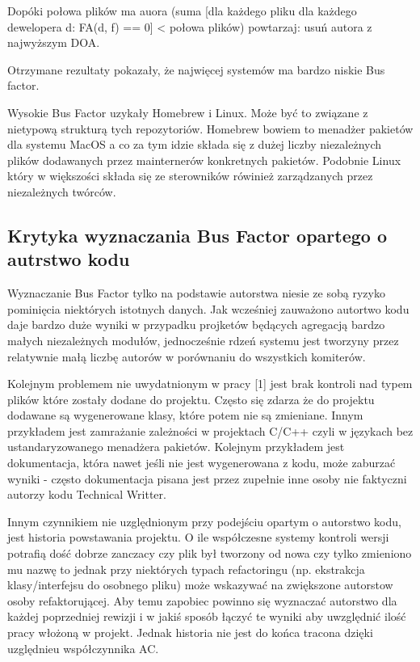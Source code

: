 \documentclass[a4paper,11pt,twoside]{report}
\theoremstyle{definition}
\begin{document}
Dopóki połowa plików ma auora (suma [dla każdego pliku dla każdego 
dewelopera d: FA(d, f) == 0] < połowa plików) powtarzaj: usuń autora z 
najwyższym DOA.

Otrzymane rezultaty pokazały, że najwięcej systemów ma bardzo niskie Bus 
factor.

Wysokie Bus Factor uzykały Homebrew i Linux. Może być to związane z 
nietypową strukturą tych repozytoriów. Homebrew bowiem to menadżer 
pakietów dla systemu MacOS a co za tym idzie składa się z dużej liczby 
niezależnych plików dodawanych przez mainternerów konkretnych pakietów. 
Podobnie Linux który w większości składa się ze sterowników rówinież 
zarządzanych przez niezależnych twórców.

\subsection{Krytyka wyznaczania Bus Factor opartego o autrstwo kodu}
Wyznaczanie Bus Factor tylko na podstawie autorstwa niesie ze sobą ryzyko 
pominięcia niektórych istotnych danych. Jak wcześniej zauważono autortwo 
kodu daje bardzo duże wyniki w przypadku projketów będących agregacją 
bardzo małych niezależnych modułów, jednocześnie rdzeń systemu jest 
tworzyny przez relatywnie małą liczbę autorów w porównaniu do wszystkich 
komiterów.

Kolejnym problemem nie uwydatnionym w pracy [1] jest brak kontroli nad typem 
plików które zostały dodane do projektu. Często się zdarza że do projektu 
dodawane są wygenerowane klasy, które potem nie są zmieniane. Innym 
przykładem jest zamrażanie zależności w projektach C/C++ czyli w językach 
bez ustandaryzowanego menadżera pakietów. Kolejnym przykładem jest 
dokumentacja, która nawet jeśli nie jest wygenerowana z kodu, może zaburzać 
wyniki - często dokumentacja pisana jest przez zupełnie inne osoby nie 
faktyczni autorzy kodu Technical Writter. 

Innym czynnikiem nie uzględnionym przy podejściu opartym o autorstwo kodu, 
jest historia powstawania projektu. O ile współczesne systemy kontroli wersji 
potrafią dość dobrze zanczacy czy plik był tworzony od nowa czy tylko 
zmieniono mu nazwę to jednak przy niektórych typach refactoringu (np. 
ekstrakcja klasy/interfejsu do osobnego pliku) może wskazywać na zwiększone 
autorstow osoby refaktorującej. Aby temu zapobiec powinno się wyznaczać 
autorstwo dla każdej poprzedniej rewizji i w jakiś sposób łączyć te 
wyniki aby uwzględnić ilość pracy włożoną w projekt. Jednak historia nie 
jest do końca tracona dzięki uzględnieu współczynnika AC.
\end{document}
